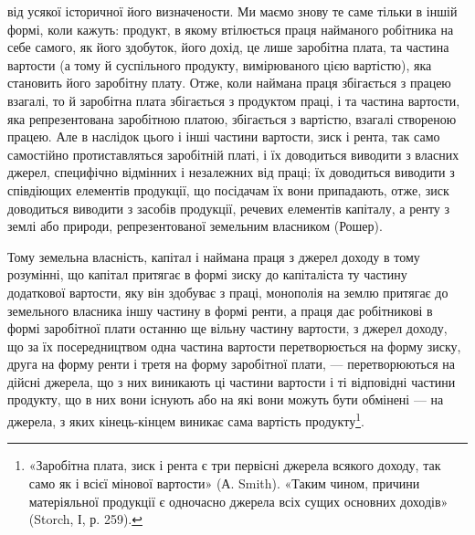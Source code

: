від усякої історичної його визначености. Ми маємо знову те саме тільки в іншій
формі, коли кажуть: продукт, в якому втілюється праця найманого робітника
на себе самого, як його здобуток, його дохід, це лише заробітна плата, та частина
вартости (а тому й суспільного продукту, вимірюваного цією вартістю),
яка становить його заробітну плату. Отже, коли наймана праця збігається з
працею взагалі, то й заробітна плата збігається з продуктом праці, і та частина
вартости, яка репрезентована заробітною платою, збігається з вартістю, взагалі
створеною працею. Але в наслідок цього і інші частини вартости, зиск і рента,
так само самостійно протиставляться заробітній платі, і їх доводиться виводити
з власних джерел, специфічно відмінних і незалежних від праці; їх доводиться
виводити з співдіющих елементів продукції, що посідачам їх вони припадають,
отже, зиск доводиться виводити з засобів продукції, речевих елементів капіталу,
а ренту з землі або природи, репрезентованої земельним власником (Рошер).

Тому земельна власність, капітал і наймана праця з джерел доходу в тому
розумінні, що капітал притягає в формі зиску до капіталіста ту частину додаткової
вартости, яку він здобуває з праці, монополія на землю притягає до
земельного власника іншу частину в формі ренти, а праця дає робітникові в
формі заробітної плати останню ще вільну частину вартости, з джерел доходу,
що за їх посередництвом одна частина вартости перетворюється на форму зиску,
друга на форму ренти і третя на форму заробітної плати, — перетворюються на
дійсні джерела, що з них виникають ці частини вартости і ті відповідні частини
продукту, що в них вони існують або на які вони можуть бути обмінені —
на джерела, з яких кінець-кінцем виникає сама вартість продукту\footnote{
«Заробітна плата, зиск і рента є три первісні джерела всякого доходу, так само як і всієї
мінової вартости» (А. Smith). «Таким чином, причини матеріяльної продукції є одночасно джерела всіх
сущих основних доходів» (Storch, І, р. 259).
}.

